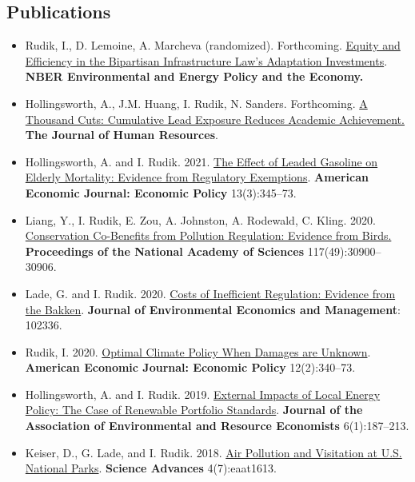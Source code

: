 \documentclass[12pt]{res} %
\begin{document}
\begin{resume}
\subsection{Publications}
\begin{itemize}
	\item[] Rudik, I., D. Lemoine, A. Marcheva (randomized). Forthcoming. \href{https://www.nber.org/books-and-chapters/environmental-and-energy-policy-and-economy-volume-6/equity-and-efficiency-bipartisan-infrastructure-laws-adaptation-investments}{Equity and Efficiency in the Bipartisan Infrastructure Law’s Adaptation Investments}. \textbf{NBER Environmental and Energy Policy and the Economy.}
	\item[] Hollingsworth, A., J.M. Huang, I. Rudik, N. Sanders. Forthcoming. \href{https://www.nber.org/papers/w28250}{A Thousand Cuts: Cumulative Lead Exposure Reduces Academic Achievement.} \textbf{The Journal of Human Resources}.
	\item[] Hollingsworth, A. and I. Rudik. 2021. \href{https://osf.io/preprints/socarxiv/rdy6g}{The Effect of Leaded Gasoline on Elderly Mortality: Evidence from Regulatory Exemptions}. \textbf{American Economic Journal: Economic Policy} 13(3):345--73.
	\item[] Liang, Y., I. Rudik, E. Zou, A. Johnston, A. Rodewald, C. Kling. 2020. \href{https://www.pnas.org/content/early/2020/11/23/2013568117}{Conservation Co-Benefits from Pollution Regulation: Evidence from Birds.} \textbf{Proceedings of the National Academy of Sciences} 117(49):30900--30906.
	\item[] Lade, G. and I. Rudik. 2020. \href{https://papers.ssrn.com/sol3/papers.cfm?abstract_id=3086728}{Costs of Inefficient Regulation: Evidence from the Bakken}. \textbf{Journal of Environmental Economics and Management}: 102336.
	\item[] Rudik, I. 2020. \href{https://www.aeaweb.org/articles?id=10.1257/pol.20160541}{Optimal Climate Policy When Damages are Unknown}. \textbf{American Economic Journal: Economic Policy} 12(2):340--73.
	\item[] Hollingsworth, A. and I. Rudik. 2019. \href{http://papers.ssrn.com/sol3/papers.cfm?abstract_id=2697222}{External Impacts of Local Energy Policy: The Case of Renewable Portfolio Standards}. \textbf{Journal of the Association of Environmental and Resource Economists} 6(1):187--213.
	\item[] Keiser, D., G. Lade, and I. Rudik. 2018. \href{http://advances.sciencemag.org/content/4/7/eaat1613}{Air Pollution and Visitation at U.S. National Parks}. \textbf{Science Advances} 4(7):eaat1613.

\end{itemize}
\end{resume}
\end{document}

